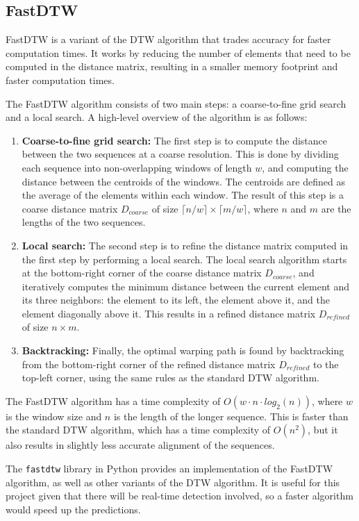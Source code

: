 \documentclass[final,rdr32.tex]{subfiles}
\begin{document}
\subsection{FastDTW}
FastDTW is a variant of the DTW algorithm that trades accuracy for faster computation times. It works by reducing the number of elements that need to be computed in the distance matrix, resulting in a smaller memory footprint and faster computation times.

The FastDTW algorithm consists of two main steps: a coarse-to-fine grid search and a local search. A high-level overview of the algorithm is as follows:

\begin{enumerate}
    \item \textbf{Coarse-to-fine grid search:} The first step is to compute the distance between the two sequences at a coarse resolution. This is done by dividing each sequence into non-overlapping windows of length $w$, and computing the distance between the centroids of the windows. The centroids are defined as the average of the elements within each window. The result of this step is a coarse distance matrix $D_{coarse}$ of size $\lceil n/w \rceil \times \lceil m/w \rceil$, where $n$ and $m$ are the lengths of the two sequences.
    \item \textbf{Local search:} The second step is to refine the distance matrix computed in the first step by performing a local search. The local search algorithm starts at the bottom-right corner of the coarse distance matrix $D_{coarse}$, and iteratively computes the minimum distance between the current element and its three neighbors: the element to its left, the element above it, and the element diagonally above it. This results in a refined distance matrix $D_{refined}$ of size $n \times m$.
    \item \textbf{Backtracking:} Finally, the optimal warping path is found by backtracking from the bottom-right corner of the refined distance matrix $D_{refined}$ to the top-left corner, using the same rules as the standard DTW algorithm.
\end{enumerate}

The FastDTW algorithm has a time complexity of $O(w \cdot n \cdot log_2(n))$, where $w$ is the window size and $n$ is the length of the longer sequence. This is faster than the standard DTW algorithm, which has a time complexity of $O(n^2)$, but it also results in slightly less accurate alignment of the sequences.

The \verb|fastdtw| library in Python provides an implementation of the FastDTW algorithm, as well as other variants of the DTW algorithm. It is useful for this project given that there will be real-time detection involved, so a faster algorithm would speed up the predictions.
\end{document}
